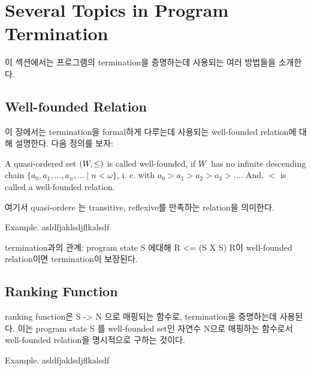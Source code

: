 \section{Several Topics in Program Termination}
이 섹션에서는 프로그램의 termination을 증명하는데 사용되는 여러 방법들을 소개한다.
\label{sec:topics}
\subsection{Well-founded Relation}
이 장에서는 termination을 formal하게 다루는데 사용되는 well-founded relation에 대해 설명한다.
다음 정의를 보자:~\cite{order}

\begin{definition}
    A quasi-ordered set $(\well, \leq)$ is called well-founded, 
    if $\well$ has no infinite descending chain $\{a_0, a_1, \dots, a_n, \dots \mid n < \omega\}$, i. e. with
    $a_0 > a_1 >a_2 > a_3 > \dots$. \newline
    And, $<$ is called a well-founded relation.
\end{definition}
여기서 quasi-ordere 는 transitive, reflexive를 만족하는 relation을 의미한다.
\begin{example}
    Example.
    asldfjaklsdjflkalsdf
\end{example}
termination과의 관계: program state S 에대해 R <= (S X S)
R이 well-founded relation이면 termination이 보장된다.

\subsection{Ranking Function}
ranking function은 S -> N 으로 매핑되는 함수로, termination을 증명하는데 사용된다.
이는 program state S 를 well-founded set인 자연수 N으로 매핑하는 함수로서
well-founded relation을 명시적으로 구하는 것이다.

\begin{example}
    Example.
    asldfjaklsdjflkalsdf
\end{example}
